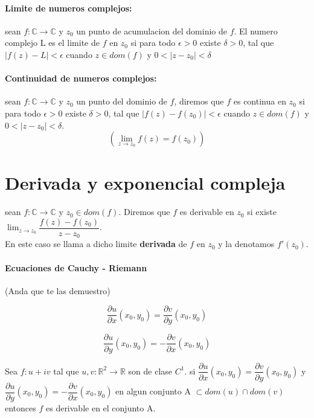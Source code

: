 \documentclass[10pt]{article}
\begin{document}
\paragraph{Limite de numeros complejos: }sean $f: \mathbb{C} \rightarrow \mathbb{C}$ y $z_0$ un punto de acumulacion
del dominio de $f$. El numero complejo L es el limite de $f$ en $z_0$ si para todo $\epsilon > 0$ existe
$\delta > 0$, tal que $|f(z)-L| < \epsilon$ cuando $z \in dom(f)$ y $0 < |z-z_0|< \delta$

\paragraph{Continuidad de numeros complejos: }sean $f: \mathbb{C} \rightarrow \mathbb{C}$ y $z_0$ un punto
del dominio de $f$, diremos que $f$ es continua en $z_0$ si para todo $\epsilon > 0$ existe
$\delta > 0$, tal que $|f(z)- f(z_0)| < \epsilon$ cuando $z \in dom(f)$ y $0 < |z-z_0|< \delta$.\\
\begin{equation*}
	\left( \lim_{z \rightarrow z_0} f(z) = f(z_0) \right)
\end{equation*}

\section{Derivada y exponencial compleja}

sean $f: \mathbb{C} \rightarrow \mathbb{C}$ y $z_0 \in dom(f)$. Diremos que $f$ es derivable en $z_0$
si existe $\lim_{z \rightarrow z_0} \dfrac{f(z)-f(z_0)}{z-z_0}$.\\
En este caso se llama a dicho limite \textbf{derivada} de $f$ en $z_0$ y la denotamos $f'(z_0)$.

\paragraph{Ecuaciones de Cauchy - Riemann} (Anda que te las demuestro)

\begin{equation*}
	\dfrac{\partial u}{\partial x} (x_0, y_0) = \dfrac{\partial v}{\partial y} (x_0, y_0)
\end{equation*}

\begin{equation*}
	\dfrac{\partial u}{\partial y} (x_0, y_0) = -\dfrac{\partial v}{\partial x} (x_0, y_0)
\end{equation*}

Sea $f: u+iv$ tal que $u, v: \mathbb{R}^2 \rightarrow \mathbb{R}$ son de clase $C^1$. si $\dfrac{\partial u}{\partial x} (x_0, y_0) = \dfrac{\partial v}{\partial y} (x_0, y_0)$ y $\dfrac{\partial u}{\partial y} (x_0, y_0) = -\dfrac{\partial v}{\partial x} (x_0, y_0)$ en algun conjunto A $\subset dom(u) \cap dom(v)$ entonces $f$ es derivable en el conjunto A.\\
\linebreak
\end{document}
